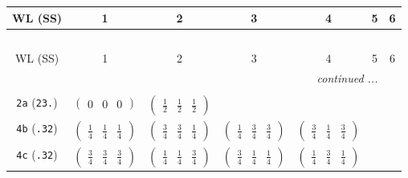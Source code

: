 \documentclass[fleqn,9pt,landscape]{jsarticle}
\begin{document}
\begin{center}
\renewcommand{\arraystretch}{1.2}
\begin{longtable}{ccccccc}
 \hline \hline
WL (SS) & 1 & 2 & 3 & 4 & 5 & 6 \\ \hline \endfirsthead

\multicolumn{6}{l}{\tablename\ \thetable{}} \\
 \hline \hline
WL (SS) & 1 & 2 & 3 & 4 & 5 & 6 \\ \hline \endhead

 \hline \hline
\multicolumn{6}{r}{\footnotesize\it continued ...} \\ \endfoot

 \hline \hline
\multicolumn{6}{r}{} \\ \endlastfoot

{\tt 2a} ({\tt 23.}) & $ \begin{pmatrix} 0 & 0 & 0 \end{pmatrix} $ & $ \begin{pmatrix} \frac{1}{2} & \frac{1}{2} & \frac{1}{2} \end{pmatrix} $ & $  $ & $  $ & $  $ & $  $ \\ \hline
{\tt 4b} ({\tt .32}) & $ \begin{pmatrix} \frac{1}{4} & \frac{1}{4} & \frac{1}{4} \end{pmatrix} $ & $ \begin{pmatrix} \frac{3}{4} & \frac{3}{4} & \frac{1}{4} \end{pmatrix} $ & $ \begin{pmatrix} \frac{1}{4} & \frac{3}{4} & \frac{3}{4} \end{pmatrix} $ & $ \begin{pmatrix} \frac{3}{4} & \frac{1}{4} & \frac{3}{4} \end{pmatrix} $ & $  $ & $  $ \\ \hline
{\tt 4c} ({\tt .32}) & $ \begin{pmatrix} \frac{3}{4} & \frac{3}{4} & \frac{3}{4} \end{pmatrix} $ & $ \begin{pmatrix} \frac{1}{4} & \frac{1}{4} & \frac{3}{4} \end{pmatrix} $ & $ \begin{pmatrix} \frac{3}{4} & \frac{1}{4} & \frac{1}{4} \end{pmatrix} $ & $ \begin{pmatrix} \frac{1}{4} & \frac{3}{4} & \frac{1}{4} \end{pmatrix} $ & $  $ & $  $ \\ \hline

\end{longtable}
\end{center}
\end{document}
